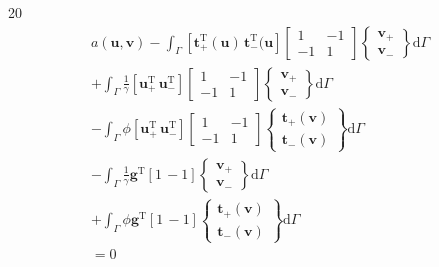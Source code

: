 \documentclass[a4paper,12pt]{article}
\begin{document}
20
\begin{equation}
\begin{split}
a(\mathbf{u},\mathbf{v})
-
\int_\Gamma
[\mathbf{t}_+^\textrm{T}(\mathbf{u})\,\mathbf{t}_-^\textrm{T}(\mathbf{u}]
\left[
\begin{array}{cc}
1 & -1\\
-1 & 1
\end{array}
\right]
\left\{
\begin{array}{c}
\mathbf{v}_+ \\ \mathbf{v}_-
\end{array}
\right\}
\textrm{d}\Gamma
\\+
\int_\Gamma
\frac{1}{\gamma}
[ \mathbf{u}_+^\textrm{T}\, \mathbf{u}_-^\textrm{T} ]
\left[
\begin{array}{cc}
1 & -1\\
-1 & 1
\end{array}
\right]
\left\{
\begin{array}{c}
\mathbf{v}_+ \\ \mathbf{v}_-
\end{array}
\right\}
\textrm{d}\Gamma
\\-
\int_\Gamma
\phi
[\mathbf{u}_+^\textrm{T}\, \mathbf{u}_-^\textrm{T}]
\left[
\begin{array}{cc}
1 & -1\\
-1 & 1
\end{array}
\right]
\left\{
\begin{array}{c}
\mathbf{t}_+(\mathbf{v})\\ \mathbf{t}_-(\mathbf{v})
\end{array}
\right\}
\textrm{d}\Gamma
\\-
\int_\Gamma
\frac{1}{\gamma}
\mathbf{g}^\textrm{T}
[ 1\, -1]
\left\{
\begin{array}{c}
\mathbf{v}_+ \\ \mathbf{v}_-
\end{array}
\right\}
\textrm{d}\Gamma
\\+
\int_\Gamma
\phi\mathbf{g}^\textrm{T}
[ 1\, -1]
\left\{
\begin{array}{c}
\mathbf{t}_+(\mathbf{v})\\ \mathbf{t}_-(\mathbf{v})
\end{array}
\right\}
\textrm{d}\Gamma
\\=
0
\end{split}
\end{equation}
\end{document}
